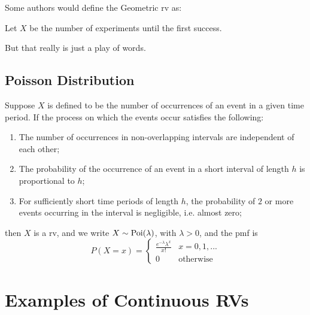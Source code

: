 \documentclass[notoc,notitlepage]{tufte-book}
\begin{document}
\begin{note}
  Some authors would define the Geometric rv as:

  Let $X$ be the number of experiments until the first success.

  But that really is just a play of words.
\end{note}


\subsection{Poisson Distribution}
\label{sub:poisson_distribution}

\begin{defn}[Poisson RV]\label{defn:poisson_rv}
  Suppose $X$ is defined to be the number of occurrences of an event in a given time period. If the process on which the events occur satisfies the following:
  \begin{enumerate}
    \item The number of occurrences in non-overlapping intervals are independent of each other;
    \item The probability of the occurrence of an event in a short interval of length $h$ is proportional to $h$;
    \item For sufficiently short time periods of length $h$, the probability of $2$ or more events occurring in the interval is negligible, i.e. almost zero;
  \end{enumerate}
  then $X$ is a  rv, and we write $X \sim \operatorname{Poi}(\lambda)$, with $\lambda > 0$, and the pmf is
  \begin{equation*}
    P(X = x) = \begin{cases} 
      \frac{e^{- \lambda} \lambda^x}{x!} & x = 0, 1, ... \\
      0                                  & \text{otherwise}
    \end{cases}
  \end{equation*}
\end{defn}



\section{Examples of Continuous RVs}
\label{sec:examples_of_continuous_rvs}
\end{document}
